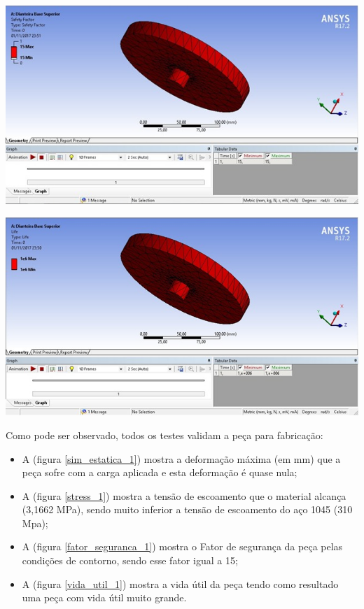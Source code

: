 
     \begin{center}
    	\includegraphics[scale=0.7]{figuras/fator_seguranca_1}
        \label{fator_seguranca_1}
    \end{center}
    

     \begin{center}
    	\includegraphics[scale=0.7]{figuras/vida_util_1}
        \label{vida_util_1}
    \end{center}


    Como pode ser observado, todos os testes validam a peça para fabricação:

    \begin{itemize}
        \item A (figura \ref{sim_estatica_1}) mostra a deformação máxima (em mm) que a peça sofre com a carga aplicada e esta deformação é quase nula;
        \item A (figura \ref{stress_1}) mostra a tensão de escoamento que o material alcança (3,1662 MPa), sendo muito inferior a tensão de escoamento do aço 1045 (310 Mpa);
        \item A (figura \ref{fator_seguranca_1}) mostra o Fator de segurança da peça pelas condições de contorno, sendo esse fator igual a 15;
        \item A (figura \ref{vida_util_1}) mostra a vida útil da peça tendo como resultado uma peça com vida útil muito grande.
    \end{itemize}
  
